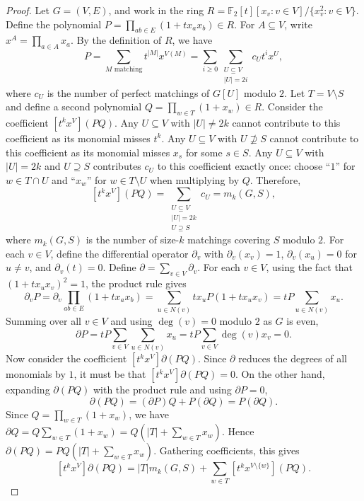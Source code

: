 \documentclass[10pt,a4paper]{amsart}
\begin{document}
\begin{proof}
    Let $G = (V, E)$, and work in the ring $R = \mathbb F_2[t][x_v:v\in V]/\{x_v^2:v\in V\}$. Define the polynomial $P = \prod_{ab\in E}(1+tx_ax_b)\in R$. For $A\subseteq V$, write $x^A = \prod_{a\in A}x_a$. By the definition of $R$, we have
    \[
        P = \sum_{M\text{ matching}}t^{|M|}x^{V(M)} = \sum_{i\ge 0}\sum_{\substack{U\subseteq V\\|U|=2i}} c_Ut^ix^U,
    \]
    where $c_U$ is the number of perfect matchings of $G[U]$ modulo $2$. Let $T = V\setminus S$ and define a second polynomial $Q = \prod_{w\in T}(1+x_w)\in R$. Consider the coefficient $[t^kx^V](P Q)$. Any $U\subseteq V$ with $|U| \neq 2k$ cannot contribute to this coefficient as its monomial misses $t^k$. Any $U\subseteq V$ with $U\not\supseteq S$ cannot contribute to this coefficient as its monomial misses $x_s$ for some $s\in S$. Any $U\subseteq V$ with $|U|=2k$ and $U\supseteq S$ contributes $c_U$ to this coefficient exactly once: choose ``$1$'' for $w\in T\cap U$ and ``$x_w$'' for $w\in T\setminus U$ when multiplying by $Q$. Therefore,
    \[
        [t^kx^V](P Q) = \sum_{\substack{U\subseteq V\\|U|=2k\\U\supseteq S}} c_U = m_k(G, S),
    \]
    where $m_k(G, S)$ is the number of size-$k$ matchings covering $S$ modulo $2$. For each $v\in V$, define the differential operator $\partial_v$ with $\partial_v(x_v) = 1$, $\partial_v(x_u) = 0$ for $u\neq v$, and $\partial_v(t) = 0$. Define $\partial = \sum_{v\in V}\partial_v$. For each $v\in V$, using the fact that $(1+tx_u x_v)^2 = 1$, the product rule gives
    \[
        \partial_v P = \partial_v\prod_{ab\in E}(1+tx_ax_b) = \sum_{u\in N(v)}tx_uP(1+tx_ux_v) = tP\sum_{u\in N(v)}x_u.
    \]
    Summing over all $v\in V$ and using $\deg(v) = 0$ modulo $2$ as $G$ is even,
    \[
        \partial P = tP\sum_{v\in V}\sum_{u\in N(v)}x_u = tP\sum_{v\in V}\deg(v)x_v = 0.
    \]
    Now consider the coefficient $[t^kx^V]\partial(P Q)$. Since $\partial$ reduces the degrees of all monomials by $1$, it must be that $[t^kx^V]\partial(P Q) = 0$. On the other hand, expanding $\partial(P Q)$ with the product rule and using $\partial P=0$,
    \[
        \partial(P Q) = (\partial P) Q + P(\partial Q) = P(\partial Q).
    \]
    Since $Q = \prod_{w\in T}(1+x_w)$, we have $\partial Q  = Q\sum_{w\in T}(1+x_w) = Q(|T| + \sum_{w\in T}x_w)$. Hence $\partial  (P Q) = P Q(|T| + \sum_{w\in T}x_w)$. Gathering coefficients, this gives
    \[
        [t^kx^V]\partial(P Q) = |T|m_k(G, S) + \sum_{w\in T}[t^kx^{V\setminus\{w\}}](P Q).
\]
\end{proof}
\end{document}

